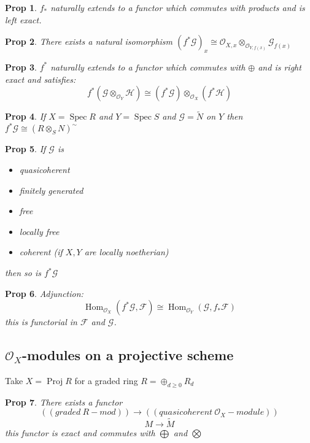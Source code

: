 \documentclass[a4paper, 12pt]{article}
\newcommand{\ca}[1]{\mathcal{#1}}
\newcommand{\caf}{\mathcal{F}}
\newcommand{\cag}{\mathcal{G}}
\newcommand{\oxmods}{$\mathcal{O}_X$-modules }
\newcommand{\ox}{\mathcal{O}_X}
\newcommand{\oy}{\mathcal{O}_Y}
\newcommand{\oxx}{\mathcal{O}_{X,x}}
\newtheorem*{prop}{Prop}
\DeclareMathOperator{\spec}{Spec}
\DeclareMathOperator{\Hom}{Hom}
\DeclareMathOperator{\proj}{Proj}
\begin{document}
	\begin{prop}
		$ f_* $ naturally extends to a functor which commutes with products and is left exact.
	\end{prop}
	
	\begin{prop}
		There exists a natural isomorphism $ (f^*\cag)_x \cong \oxx \otimes_{\ca{O}_{Y,f(x)}} \cag_{f(x)} $
	\end{prop}
	
	\begin{prop}
		$ f^* $ naturally extends to a functor which commutes with $ \oplus $ and is right exact and satisfies:
		\[ f^*(\cag \otimes_{\oy} \ca{H}) \cong (f^*\cag) \otimes_{\ox} (f^*\ca{H}) \]
	\end{prop}
	
	\begin{prop}
		If $ X = \spec R $ and $ Y = \spec S $ and $ \cag = \tilde{N} $ on $ Y $ then $ f^*\cag \cong (R \otimes_S N)^{\sim} $
	\end{prop}
	
	\begin{prop}
		If $ \cag $ is 
		\begin{itemize}
			\item quasicoherent
			\item finitely generated
			\item free
			\item locally free
			\item coherent (if $ X,Y $ are locally noetherian)
		\end{itemize}
		then so is $ f^*\cag $
	\end{prop}
	
	\begin{prop}
		Adjunction:
		\[ \Hom_{\ox}(f^*\cag, \caf) \cong \Hom_{\oy} (\cag , f_*\caf) \]
		this is functorial in $ \caf $ and $ \cag $.
	\end{prop}
	
	
	\subsection{\oxmods on a projective scheme}
	
	Take $ X = \proj R $ for a graded ring $ R = \oplus_{d\geq 0} R_d $ 
	
	\begin{prop}
		There exists a functor
		\[ ((graded \: R-mod)) \longrightarrow ((quasicoherent \: \ox - module)) \]
		\[ M \longrightarrow \tilde{M} \]
		this functor is exact and commutes with $ \bigoplus $ and $ \bigotimes $ 
	\end{prop}
	
\end{document}

